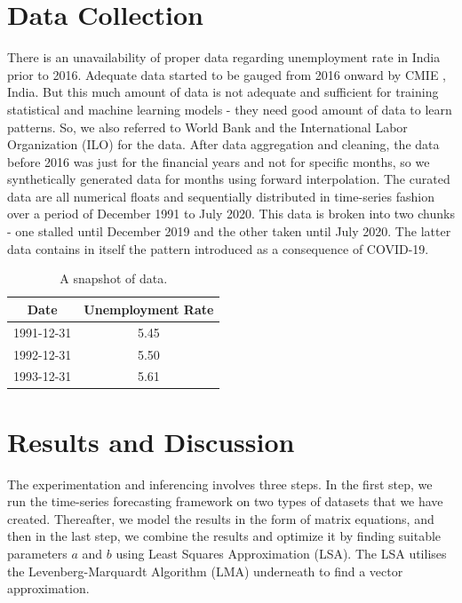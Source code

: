 \documentclass[times,twocolumn,final,authoryear]{elsarticle}
\begin{document}
	
	\section{Data Collection}\label{Sec_Data}
	There is an unavailability of proper data regarding unemployment rate in India prior to 2016. Adequate data started to be gauged from 2016 onward by CMIE \cite{CMIE}, India. But this much amount of data is not adequate and sufficient for training statistical and machine learning models - they need good amount of data to learn patterns. So, we also referred to World Bank and the International Labor Organization (ILO) for the data. After data aggregation and cleaning, the data before 2016 was just for the financial years and not for specific months, so we synthetically generated data for months using forward interpolation. The curated data are all numerical floats and sequentially distributed in time-series fashion over a period of December 1991 to July 2020. This data is broken into two chunks - one stalled until December 2019 and the other taken until July 2020. The latter data contains in itself the pattern introduced as a consequence of COVID-19.
	
	\begin{table}[!h]
		\renewcommand{\arraystretch}{1.3}
		\caption{A snapshot of data.}
		\label{data_snap}
		\centering
		\begin{tabular}{|c|c|}
			\hline
			\textbf{Date} & \textbf{Unemployment Rate}\\
			\hline
			1991-12-31 & 5.45\\
			1992-12-31 & 5.50\\
			1993-12-31 & 5.61\\
			\hline
		\end{tabular}
	\end{table}
	
	\section{Results and Discussion}\label{Sec_Results}
	The experimentation and inferencing involves three steps. In the first step, we run the time-series forecasting framework on two types of datasets that we have created. Thereafter, we model the results in the form of matrix equations, and then in the last step, we combine the results and optimize it by finding suitable parameters \(a\) and \(b\) using Least Squares Approximation (LSA). The LSA utilises the Levenberg-Marquardt Algorithm (LMA)\cite{LMA} underneath to find a vector approximation. 
	
\end{document}
